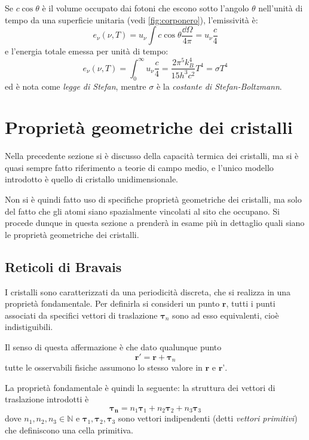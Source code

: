 Se $ c\cos \theta $ è il volume occupato dai fotoni che escono sotto l'angolo $ \theta $ nell'unità di tempo da una superficie unitaria (vedi \cref{fig:corponero}), l'emissività è:
\begin{equation*}
e_\nu (\nu,T) = u_\nu \int c \cos \theta \frac{\dd \Omega}{4\pi} = u_\nu \frac{c}{4}
\end{equation*}
e l'energia totale emessa per unità di tempo:
\begin{equation*}
e_\nu (\nu,T) = \int_{0}^{\infty} u_\nu \frac{c}{4} = \frac{2 \pi^5 k_B^4}{15h^3c^2}T^4 = \sigma T^4
\end{equation*}
ed è nota come \textit{legge di Stefan}, mentre $ \sigma $ è la \textit{costante di Stefan-Boltzmann}.

\section{Proprietà geometriche dei cristalli}

Nella precedente sezione si è discusso della capacità termica dei cristalli, ma si è quasi sempre fatto riferimento a teorie di campo medio, e l'unico modello introdotto è quello di cristallo unidimensionale.

Non si è quindi fatto uso di specifiche proprietà geometriche dei cristalli, ma solo del fatto che gli atomi siano spazialmente vincolati al sito che occupano. Si procede dunque in questa sezione a prenderà in esame più in dettaglio quali siano le proprietà geometriche dei cristalli.

\subsection{Reticoli di Bravais}

I cristalli sono caratterizzati da una periodicità discreta, che si realizza in una proprietà fondamentale. Per definirla si consideri un punto $ \textbf{r} $, tutti i punti associati da specifici vettori di traslazione $ \bm{\tau}_n $ sono ad esso equivalenti, cioè indistiguibili.

Il senso di questa affermazione è che dato qualunque punto
\[ \textbf{r}' = \textbf{r} + \bm{\tau}_n \]
tutte le osservabili fisiche assumono lo stesso valore in $ \textbf{r} $ e $ \textbf{r'} $.

La proprietà fondamentale è quindi la seguente: la struttura dei vettori di traslazione introdotti è
\[ \bm{\tau}_{\textbf{n}} = n_1 \bm{\tau}_1 + n_2 \bm{\tau}_2 + n_3 \bm{\tau}_3  \]
dove $ n_1, n_2, n_3 \in \mathbb{N} $ e $ \bm{\tau}_1, \bm{\tau}_2, \bm{\tau}_3 $ sono vettori indipendenti (detti \textit{vettori primitivi}) che definiscono una cella primitiva.

